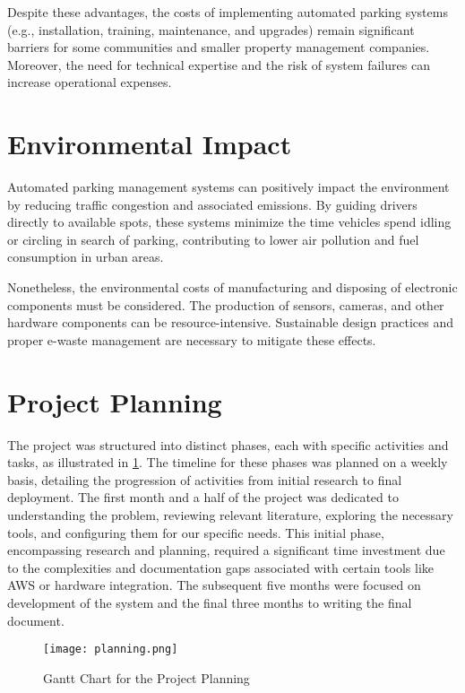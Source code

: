 Despite these advantages, the costs of implementing automated parking systems (e.g., installation, training, maintenance, and upgrades) remain significant barriers for some communities and smaller property management companies. Moreover, the need for technical expertise and the risk of system failures can increase operational expenses.

\section{Environmental Impact}

Automated parking management systems can positively impact the environment by reducing traffic congestion and associated emissions. By guiding drivers directly to available spots, these systems minimize the time vehicles spend idling or circling in search of parking, contributing to lower air pollution and fuel consumption in urban areas.

Nonetheless, the environmental costs of manufacturing and disposing of electronic components must be considered. The production of sensors, cameras, and other hardware components can be resource-intensive. Sustainable design practices and proper e-waste management are necessary to mitigate these effects.

\section{Project Planning}

The project was structured into distinct phases, each with specific activities and tasks, as illustrated in \cref{fig:planning}. The timeline for these phases was planned on a weekly basis, detailing the progression of activities from initial research to final deployment. The first month and a half of the project was dedicated to understanding the problem, reviewing relevant literature, exploring the necessary tools, and configuring them for our specific needs. This initial phase, encompassing research and planning, required a significant time investment due to the complexities and documentation gaps associated with certain tools like AWS or hardware integration. The subsequent five months were focused on development of the system and the final three months to writing the final document.

\begin{figure}
    \texttt{[image: planning.png]}
    \caption{Gantt Chart for the Project Planning}\label{fig:planning}
\end{figure}

